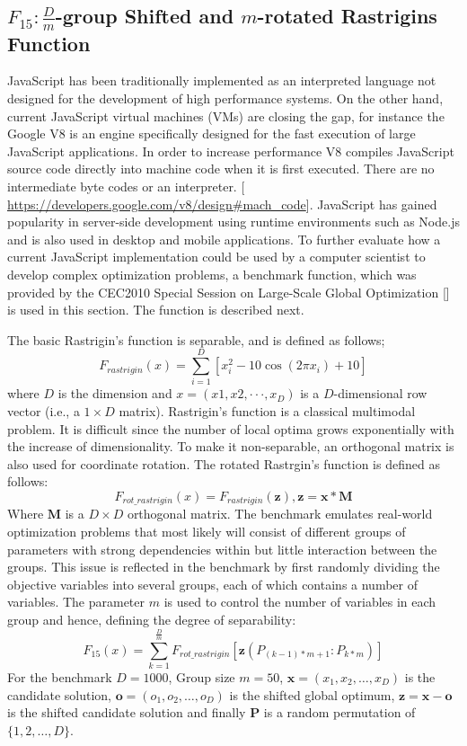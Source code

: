 \documentclass[journal,onecolumn]{IEEEtran}
\begin{document}
\subsection{$F_{15}:\frac{D}{m}$-group Shifted and $m$-rotated Rastrigins Function}
JavaScript has been traditionally implemented as an interpreted
language not designed for the development of high performance
systems. On the other hand, current JavaScript  
virtual machines (VMs) are closing the gap, for instance the Google V8 
is an engine specifically designed for the fast execution of 
large JavaScript applications. In order to increase performance
V8 compiles JavaScript source code directly into machine code when it is first executed. 
There are no intermediate byte codes or an interpreter.
[\url{ https://developers.google.com/v8/design#mach_code}].
JavaScript has gained popularity in server-side development using runtime
environments such as Node.js and is also used in desktop and mobile applications. 
To further evaluate how a current JavaScript implementation could be used by a
computer scientist to develop complex optimization problems,
a benchmark function, which was provided by the CEC2010 Special Session on
Large-Scale Global Optimization [] is used in this section. 
The function is described next.


The basic Rastrigin's function is separable, and is defined as follows;
\begin{equation}
F_{rastrigin}(x)=\sum\limits_{i=1}^D [ x_{i}^{2}-10\cos(2\pi x_i)+10  ] 
\end{equation}
where $D$ is the dimension and $x = (x1, x2, · · · , x_{D})$ is a
$D$-dimensional row vector (i.e., a $1 × D$ matrix). Rastrigin’s function 
is a classical multimodal problem. It is difficult since the number of local
optima grows exponentially with the increase of dimensionality. To make it 
non-separable, an orthogonal matrix is also used for coordinate rotation.
The rotated Rastrgin’s function is defined as follows:
\begin{equation}
F_{rot\_rastrigin}(x)=F_{rastrigin}(\textbf{z}), \textbf{z}= \textbf{x} * \textbf{M}
\end{equation}
Where $\textbf{M}$ is  a $D \times{D}$ orthogonal matrix. The benchmark
emulates real-world optimization problems that most likely will consist 
of different groups of parameters with strong dependencies within
but little interaction between the groups. This issue is reflected in the benchmark 
by first randomly dividing the objective variables
into several groups, each of which contains a number of variables. The parameter $m$ 
is used to control the number of variables in each group and hence, defining the degree
of separability:
\begin{equation}
F_{15}(x)=\sum\limits_{k=1}^\frac{D}{m}F_{rot\_rastrigin}[\textbf{z}(P_{(k-1)*m+1}:P_{k*m})] 
\end{equation}
For the benchmark $D = 1000$, Group size $m = 50$, $\textbf{x} = (x_1, x_2, \ldots , x_{D})$ is the
candidate solution, $\textbf{o} = (o_1, o_2, \ldots  , o_{D})$ is the shifted global optimum,
$\textbf{z} = \textbf{x} - \textbf{o}$ is the shifted candidate solution and
finally $\textbf{P}$ is a random permutation of $\lbrace1, 2, \ldots  ,D\rbrace$.
\end{document}
